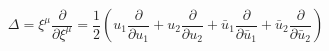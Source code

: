 \begin{equation}
\Delta = \xi^{\mu} \frac{\partial}{\partial \xi^{\mu}} = \frac{1}{2}
(u_{1}\frac{\partial}{\partial u_{1}}+u_{2}\frac{\partial}{\partial u_{2}}+
\bar{u}_{1}\frac{\partial}{\partial \bar{u}_{1}} + \bar{u}_{2}\frac{\partial}{\partial
\bar{u}_{2}})
\end{equation}

